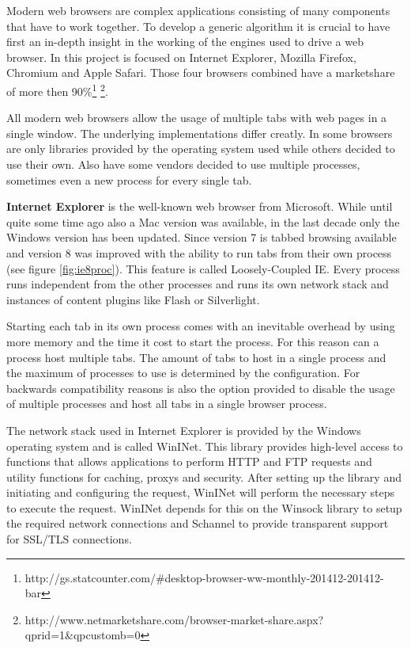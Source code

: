 

Modern web browsers are complex applications consisting of many components that have to work together. To develop a generic algorithm it is crucial to have first an in-depth insight in the working of the engines used to drive a web browser. In this project is focused on Internet Explorer, Mozilla Firefox, Chromium and Apple Safari. Those four browsers combined have a marketshare of more then 90\%\footnote{http://gs.statcounter.com/\#desktop-browser-ww-monthly-201412-201412-bar} \footnote{http://www.netmarketshare.com/browser-market-share.aspx?qprid=1\&qpcustomb=0}.

All modern web browsers allow the usage of multiple tabs with web pages in a single window. The underlying implementations differ creatly. In some browsers are only libraries provided by the operating system used while others decided to use their own. Also have some vendors decided to use multiple processes, sometimes even a new process for every single tab.

\textbf{Internet Explorer} is the well-known web browser from Microsoft. While until quite some time ago also a Mac version was available, in the last decade only the Windows version has been updated. Since version 7 is tabbed browsing available and version 8 was improved with the ability to run tabs from their own process (see figure \ref{fig:ie8proc}). This feature is called Loosely-Coupled IE\cite{http://blogs.msdn.com/b/ie/archive/2008/03/11/ie8-and-loosely-coupled-ie-lcie.aspx}. Every process runs independent from the other processes and runs its own network stack and instances of content plugins like Flash or Silverlight.

Starting each tab in its own process comes with an inevitable overhead by using more memory and the time it cost to start the process. For this reason can a process host multiple tabs. The amount of tabs to host in a single process and the maximum of processes to use is determined by the configuration. For backwards compatibility reasons is also the option provided to disable the usage of multiple processes and host all tabs in a single browser process.

The network stack used in Internet Explorer is provided by the Windows operating system and is called WinINet. This library provides high-level access to functions that allows applications to perform HTTP and FTP requests and utility functions for caching, proxys and security. After setting up the library and initiating and configuring the request, WinINet will perform the necessary steps to execute the request. WinINet depends for this on the Winsock library to setup the required network connections and Schannel to provide transparent support for SSL/TLS connections.

